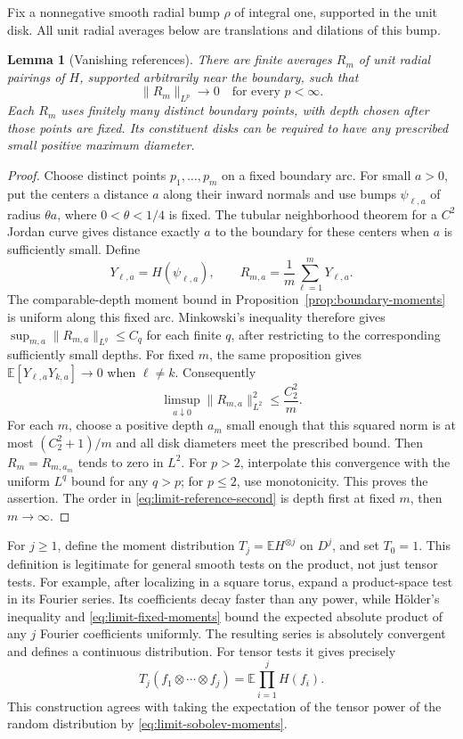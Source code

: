 \documentclass[11pt]{article}
\newcommand{\E}{\mathbb E}
\newtheorem{lemma}[theorem]{Lemma}
\theoremstyle{definition}
\theoremstyle{remark}
\numberwithin{equation}{section}
\begin{document}
Fix a nonnegative smooth radial bump \(\rho\) of integral one,
supported in the unit disk.  All unit radial averages below are
translations and dilations of this bump.

\begin{lemma}[Vanishing references]
\label{limit:references}
There are finite averages \(R_m\) of unit radial pairings of \(H\),
supported arbitrarily near the boundary, such that
\[
       \|R_m\|_{L^p}\longrightarrow0
       \quad\text{for every }p<\infty.
\]
Each \(R_m\) uses finitely many distinct boundary points, with depth
chosen after those points are fixed.  Its constituent disks can be
required to have any prescribed small positive maximum diameter.
\end{lemma}

\begin{proof}
Choose distinct points \(p_1,\ldots,p_m\) on a fixed boundary arc.
For small \(a>0\), put the centers a distance \(a\) along their inward
normals and use bumps \(\psi_{\ell,a}\) of radius \(\theta a\), where
\(0<\theta<1/4\) is fixed.  The tubular neighborhood theorem for a
\(C^2\) Jordan curve gives distance exactly \(a\) to the boundary for
these centers when \(a\) is sufficiently small.  Define
\[
 Y_{\ell,a}=H(\psi_{\ell,a}),\qquad
 R_{m,a}=\frac1m\sum_{\ell=1}^m Y_{\ell,a}.
\]
The comparable-depth moment bound in
Proposition~\ref{prop:boundary-moments} is uniform along this fixed
arc.  Minkowski's inequality therefore gives
\(\sup_{m,a}\|R_{m,a}\|_{L^q}\le C_q\) for each finite \(q\), after
restricting to the corresponding sufficiently small depths.
For fixed \(m\), the same proposition gives
\(\E[Y_{\ell,a}Y_{k,a}]\to0\) when \(\ell\ne k\).
Consequently
\begin{equation}
  \limsup_{a\downarrow0}\|R_{m,a}\|_{L^2}^2
       \le \frac{C_2^2}{m}.
  \label{eq:limit-reference-second}
\end{equation}
For each \(m\), choose a positive depth \(a_m\) small enough that this
squared norm is at most \((C_2^2+1)/m\) and all disk diameters meet
the prescribed bound.  Then \(R_m=R_{m,a_m}\) tends to zero in
\(L^2\).  For \(p>2\), interpolate this convergence with the uniform
\(L^q\) bound for any \(q>p\); for \(p\le2\), use monotonicity.
This proves the assertion.  The order in
\eqref{eq:limit-reference-second} is depth first at fixed \(m\),
then \(m\to\infty\).
\end{proof}

For \(j\ge1\), define the moment distribution \(T_j=\E H^{\otimes j}\)
on \(D^j\), and set \(T_0=1\).  This definition is legitimate for
general smooth tests on the product, not just tensor tests.
For example, after localizing in a square torus, expand a product-space
test in its Fourier series.  Its coefficients decay faster than any
power, while H\"older's inequality and
\eqref{eq:limit-fixed-moments} bound the expected absolute product of
any \(j\) Fourier coefficients uniformly.  The resulting series is
absolutely convergent and defines a continuous distribution.
For tensor tests it gives precisely
\[
 T_j(f_1\otimes\cdots\otimes f_j)
       =\E\prod_{i=1}^j H(f_i).
\]
This construction agrees with taking the expectation of the tensor
power of the random distribution by
\eqref{eq:limit-sobolev-moments}.
\end{document}
